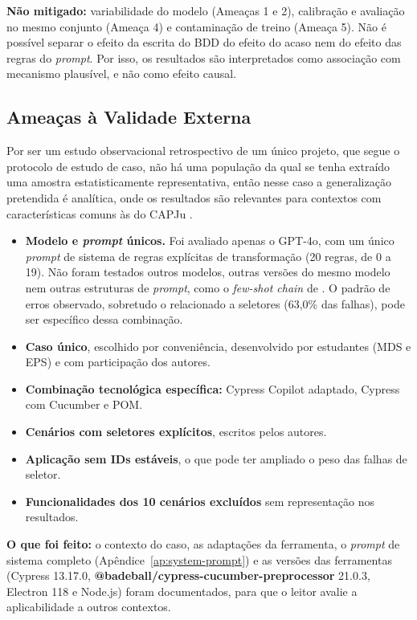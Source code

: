 \textbf{Não mitigado:} variabilidade do modelo (Ameaças 1 e 2), calibração e avaliação no mesmo conjunto (Ameaça 4) e contaminação de treino (Ameaça 5). Não é possível separar o efeito da escrita do BDD do efeito do acaso nem do efeito das regras do \textit{prompt}. Por isso, os resultados são interpretados como associação com mecanismo plausível, e não como efeito causal.

\subsection{Ameaças à Validade Externa}

Por ser um estudo observacional retrospectivo de um único projeto, que segue o protocolo de estudo de caso, não há uma população da qual se tenha extraído uma amostra estatisticamente representativa, então nesse caso a generalização pretendida é analítica, onde os resultados são relevantes para contextos com características comuns às do CAPJu \cite{runeson2009}.

\begin{itemize}
    \item \textbf{Modelo e \textit{prompt} únicos.} Foi avaliado apenas o GPT-4o, com um único \textit{prompt} de sistema de regras explícitas de transformação (20 regras, de 0 a 19). Não foram testados outros modelos, outras versões do mesmo modelo nem outras estruturas de \textit{prompt}, como o \textit{few-shot chain} de . O padrão de erros observado, sobretudo o relacionado a seletores (63,0\% das falhas), pode ser específico dessa combinação.
    \item \textbf{Caso único}, escolhido por conveniência, desenvolvido por estudantes (MDS e EPS) e com participação dos autores.
    \item \textbf{Combinação tecnológica específica:} Cypress Copilot adaptado, Cypress com Cucumber e POM.
    \item \textbf{Cenários com seletores explícitos}, escritos pelos autores.
    \item \textbf{Aplicação sem IDs estáveis}, o que pode ter ampliado o peso das falhas de seletor.
    \item \textbf{Funcionalidades dos 10 cenários excluídos} sem representação nos resultados.
\end{itemize}

\textbf{O que foi feito:} o contexto do caso, as adaptações da ferramenta, o \textit{prompt} de sistema completo (Apêndice~\ref{ap:system-prompt}) e as versões das ferramentas (Cypress 13.17.0, \textbf{@badeball/cypress-cucumber-preprocessor} 21.0.3, Electron 118 e Node.js) foram documentados, para que o leitor avalie a aplicabilidade a outros contextos.

